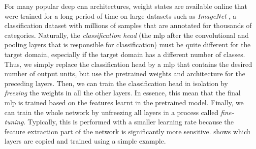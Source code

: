 \documentclass[../report.tex]{subfiles}
\begin{document}
For many popular deep \gls{cnn} architectures, weight states are available online that were trained for a long period of time on large datasets such as \emph{ImageNet} \cite{deng2009}, a classification dataset with millions of samples that are annotated for thousands of categories.
Naturally, the \emph{classification head} (the \gls{mlp} after the convolutional and pooling layers that is responsible for classification) must be quite different for the target domain, especially if the target domain has a different number of classes.
Thus, we simply replace the classification head by a \gls{mlp} that contains the desired number of output units, but use the pretrained weights and architecture for the preceding layers.
Then, we can train the classification head in isolation by \emph{freezing} the weights in all the other layers.
In essence, this mean that the final \gls{mlp} is trained based on the features learnt in the pretrained model.
Finally, we can train the whole network by unfreezing all layers in a process called \emph{fine-tuning}.
Typically, this is performed with a smaller learning rate because the feature extraction part of the network is significantly more sensitive.
 shows which layers are copied and trained using a simple example.
\end{document}
